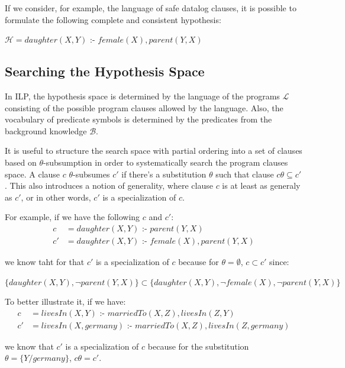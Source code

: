 If we consider, for example, the language of safe datalog clauses, it is possible to formulate the following complete
and consistent hypothesis:

\begin{center}
  $\mathcal{H} = daughter(X,Y)$ :- $female(X),parent(Y,X)$ 
\end{center}

\subsection{Searching the Hypothesis Space}

In ILP, the hypothesis space is determined by the language of the programs $\mathcal{L}$ consisting of the possible
program clauses allowed by the language. Also, the vocabulary of predicate symbols is determined by the predicates from
the background knowledge $\mathcal{B}$.

It is useful to structure the search space with partial ordering into a set of clauses based on $\theta$-subsumption in
order to systematically search the program clauses space. A clause $c$ $\theta$-subsumes $c'$ if there's a
substitution $\theta$ such that clause $c\theta \subseteq c'$. This also introduces a notion of generality, where
clause $c$ is at least as generaly as $c'$, or in other words, $c'$ is a specialization of $c$.

For example, if we have the following $c$ and $c'$:
\begin{align}
  c &= daughter(X,Y) \text{ :- } parent(Y,X) \\
  c'&= daughter(X,Y )\text{ :- } female(X),parent(Y,X)
\end{align}

we know taht for that $c'$ is a specialization of $c$ because for $\theta=\emptyset$, $c \subset c'$ since:
\begin{center}
$\{daughter(X,Y),\neg parent(Y,X)\} \subset \{daughter(X,Y),\neg female(X),\neg parent(Y,X)\}$ 
\end{center}

To better illustrate it, if we have:
\begin{align}
  c &= livesIn(X,Y) \text{ :- } marriedTo(X,Z),livesIn(Z,Y)\\
  c'&=livesIn(X,germany) \text{ :- } marriedTo(X,Z),livesIn(Z,germany)
\end{align}

we know that $c'$ is a specialization of $c$ because for the substitution $\theta=\{Y/germany\}$, $c\theta=c'$.

